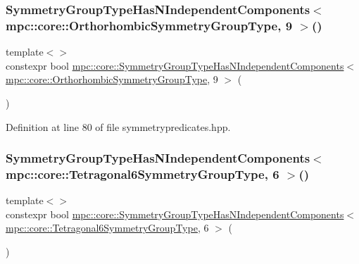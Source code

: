 \subsubsection{\texorpdfstring{Symmetry\+Group\+Type\+Has\+N\+Independent\+Components$<$ mpc\+::core\+::\+Orthorhombic\+Symmetry\+Group\+Type, 9 $>$()}{SymmetryGroupTypeHasNIndependentComponents< mpc::core::OrthorhombicSymmetryGroupType, 9 >()}}
{\footnotesize\ttfamily template$<$$>$ \\
constexpr bool \mbox{\hyperlink{namespacempc_1_1core_a4fc1927e7fe7eb577a6bef4ab6bfb4e4}{mpc\+::core\+::\+Symmetry\+Group\+Type\+Has\+N\+Independent\+Components}}$<$ \mbox{\hyperlink{structmpc_1_1core_1_1_orthorhombic_symmetry_group_type}{mpc\+::core\+::\+Orthorhombic\+Symmetry\+Group\+Type}}, 9 $>$ (\begin{DoxyParamCaption}{ }\end{DoxyParamCaption})\hspace{0.3cm}{\ttfamily [inline]}}



Definition at line 80 of file symmetrypredicates.\+hpp.

\mbox{\label{namespacempc_1_1core_aaa99a161d476fdf2e9221868cf4bcf25}} 
\subsubsection{\texorpdfstring{Symmetry\+Group\+Type\+Has\+N\+Independent\+Components$<$ mpc\+::core\+::\+Tetragonal6\+Symmetry\+Group\+Type, 6 $>$()}{SymmetryGroupTypeHasNIndependentComponents< mpc::core::Tetragonal6SymmetryGroupType, 6 >()}}
{\footnotesize\ttfamily template$<$$>$ \\
constexpr bool \mbox{\hyperlink{namespacempc_1_1core_a4fc1927e7fe7eb577a6bef4ab6bfb4e4}{mpc\+::core\+::\+Symmetry\+Group\+Type\+Has\+N\+Independent\+Components}}$<$ \mbox{\hyperlink{structmpc_1_1core_1_1_tetragonal6_symmetry_group_type}{mpc\+::core\+::\+Tetragonal6\+Symmetry\+Group\+Type}}, 6 $>$ (\begin{DoxyParamCaption}{ }\end{DoxyParamCaption})\hspace{0.3cm}{\ttfamily [inline]}}



